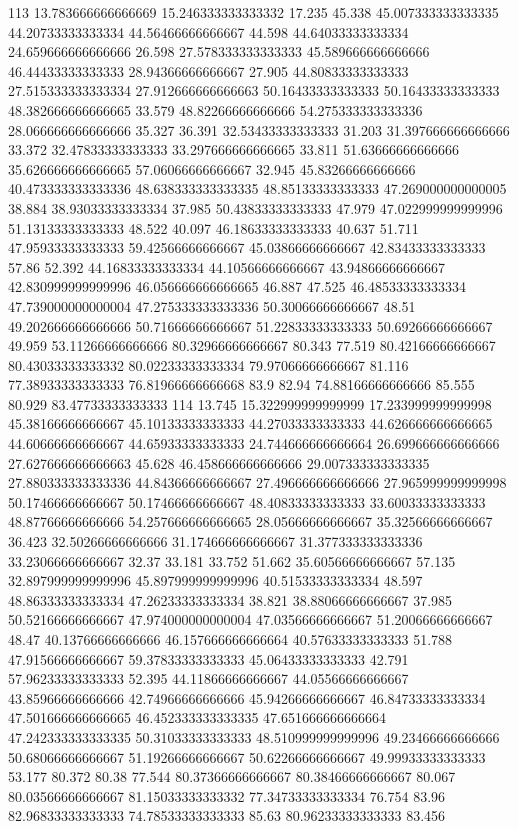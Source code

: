 113 13.783666666666669 15.246333333333332 17.235 45.338 45.007333333333335 44.20733333333334 44.56466666666667 44.598 44.64033333333334 24.659666666666666 26.598 27.578333333333333 45.589666666666666 46.44433333333333 28.94366666666667 27.905 44.80833333333333 27.515333333333334 27.912666666666663 50.16433333333333 50.16433333333333 48.382666666666665 33.579 48.82266666666666 54.275333333333336 28.066666666666666 35.327 36.391 32.53433333333333 31.203 31.397666666666666 33.372 32.47833333333333 33.297666666666665 33.811 51.63666666666666 35.626666666666665 57.06066666666667 32.945 45.83266666666666 40.473333333333336 48.638333333333335 48.85133333333333 47.269000000000005 38.884 38.93033333333334 37.985 50.43833333333333 47.979 47.022999999999996 51.13133333333333 48.522 40.097 46.18633333333333 40.637 51.711 47.95933333333333 59.42566666666667 45.03866666666667 42.83433333333333 57.86 52.392 44.16833333333334 44.10566666666667 43.94866666666667 42.830999999999996 46.056666666666665 46.887 47.525 46.48533333333334 47.739000000000004 47.275333333333336 50.30066666666667 48.51 49.202666666666666 50.71666666666667 51.22833333333333 50.69266666666667 49.959 53.11266666666666 80.32966666666667 80.343 77.519 80.42166666666667 80.43033333333332 80.02233333333334 79.97066666666667 81.116 77.38933333333333 76.81966666666668 83.9 82.94 74.88166666666666 85.555 80.929 83.47733333333333
114 13.745 15.322999999999999 17.233999999999998 45.38166666666667 45.10133333333333 44.27033333333333 44.626666666666665 44.60666666666667 44.65933333333333 24.744666666666664 26.699666666666666 27.627666666666663 45.628 46.458666666666666 29.007333333333335 27.880333333333336 44.84366666666667 27.496666666666666 27.965999999999998 50.17466666666667 50.17466666666667 48.40833333333333 33.60033333333333 48.87766666666666 54.257666666666665 28.05666666666667 35.32566666666667 36.423 32.50266666666666 31.174666666666667 31.377333333333336 33.23066666666667 32.37 33.181 33.752 51.662 35.60566666666667 57.135 32.897999999999996 45.897999999999996 40.51533333333334 48.597 48.86333333333334 47.26233333333334 38.821 38.88066666666667 37.985 50.52166666666667 47.974000000000004 47.03566666666667 51.20066666666667 48.47 40.13766666666666 46.157666666666664 40.57633333333333 51.788 47.91566666666667 59.37833333333333 45.06433333333333 42.791 57.96233333333333 52.395 44.11866666666667 44.05566666666667 43.85966666666666 42.74966666666666 45.94266666666667 46.84733333333334 47.501666666666665 46.452333333333335 47.651666666666664 47.242333333333335 50.31033333333333 48.510999999999996 49.23466666666666 50.68066666666667 51.19266666666667 50.62266666666667 49.99933333333333 53.177 80.372 80.38 77.544 80.37366666666667 80.38466666666667 80.067 80.03566666666667 81.15033333333332 77.34733333333334 76.754 83.96 82.96833333333333 74.78533333333333 85.63 80.96233333333333 83.456

